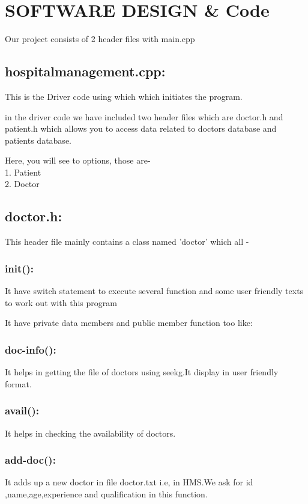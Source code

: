 \documentclass[a4paper, 14pt]{report}
\begin{document}
{\newpage
\chapter{SOFTWARE DESIGN & Code}
Our project consists of 2 header files with main.cpp\\

\section{hospitalmanagement.cpp: }
This is the Driver code using which which initiates the program.

in the driver code we have included two header files which are doctor.h and patient.h which allows you to access data related to doctors database and patients database.

Here, you will see to options, those are-\\
1. Patient \\
2. Doctor

\section{doctor.h:}
This header file mainly contains a class named 'doctor'
which all -

\subsection{init():}
It have switch statement to execute several function and some user friendly texts
 to work out with this program

It have private data members and public member function too like:

\subsection{doc-info():}
It helps in getting the file of doctors using seekg.It display in user friendly format. 

\subsection{avail():}
It helps in checking the availability of doctors.

\subsection{add-doc():}
It adds up a new doctor in file doctor.txt i.e, in HMS.We ask for id ,name,age,experience and qualification in this function.

}
\end{document}
